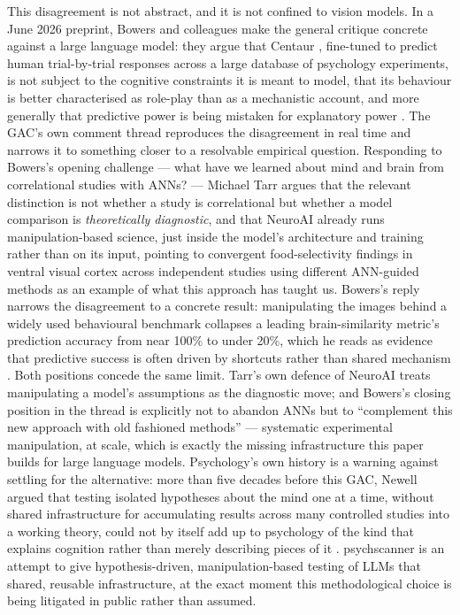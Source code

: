 \documentclass[11pt]{article}
\begin{document}
This disagreement is not abstract, and it is not confined to vision models.
In a June 2026 preprint, Bowers and colleagues make the general critique
concrete against a large language model: they argue that Centaur
\citep{binz2025foundation}, fine-tuned to predict human trial-by-trial
responses across a large database of psychology experiments, is not subject
to the cognitive constraints it is meant to model, that its behaviour is
better characterised as role-play than as a mechanistic account, and more
generally that predictive power is being mistaken for explanatory power
\citep{bowers2026centaurcritique}. The GAC's own comment thread reproduces
the disagreement in real time and narrows it to something closer to a
resolvable empirical question. Responding to Bowers's opening challenge —
what have we learned about mind and brain from correlational studies with
ANNs? — Michael Tarr argues that the relevant distinction is not whether a
study is correlational but whether a model comparison is
\emph{theoretically diagnostic}, and that NeuroAI already runs
manipulation-based science, just inside the model's architecture and
training rather than on its input, pointing to convergent food-selectivity
findings in ventral visual cortex across independent studies using
different ANN-guided methods as an example of what this approach has
taught us. Bowers's reply narrows the disagreement to a concrete result:
manipulating the images behind a widely used behavioural benchmark
collapses a leading brain-similarity metric's prediction accuracy from near
100\% to under 20\%, which he reads as evidence that predictive success is
often driven by shortcuts rather than shared mechanism
\citep{gac2026discussion}. Both positions concede the same limit. Tarr's
own defence of NeuroAI treats manipulating a model's assumptions as the
diagnostic move; and Bowers's closing position in the thread is explicitly
not to abandon ANNs but to ``complement this new approach with old
fashioned methods'' \citep{gac2026discussion} — systematic experimental
manipulation, at scale, which is exactly the missing infrastructure this
paper builds for large language models. Psychology's own history is a
warning against settling for the alternative: more than five decades before
this GAC, Newell argued that testing isolated hypotheses about the mind one
at a time, without shared infrastructure for accumulating results across
many controlled studies into a working theory, could not by itself add up
to psychology of the kind that explains cognition rather than merely
describing pieces of it \citep{newell1973twentyquestions}. psychscanner is
an attempt to give hypothesis-driven, manipulation-based testing of LLMs
that shared, reusable infrastructure, at the exact moment this
methodological choice is being litigated in public rather than assumed.
\end{document}
